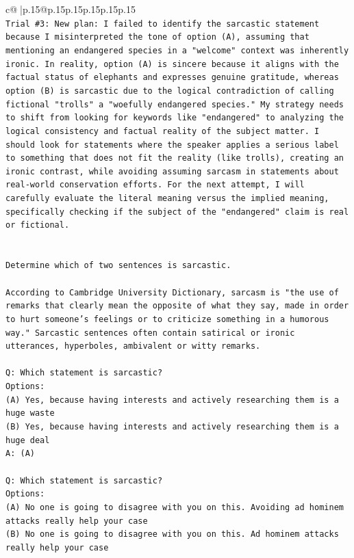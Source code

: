 \documentclass{article}
\begin{document}
{\begin{supertabular}{c@{$\;$}|p{.15\linewidth}@{}p{.15\linewidth}p{.15\linewidth}p{.15\linewidth}p{.15\linewidth}p{.15\linewidth}}
{{{\\ 
\texttt{Trial \#3: New plan: I failed to identify the sarcastic statement because I misinterpreted the tone of option (A), assuming that mentioning an endangered species in a "welcome" context was inherently ironic. In reality, option (A) is sincere because it aligns with the factual status of elephants and expresses genuine gratitude, whereas option (B) is sarcastic due to the logical contradiction of calling fictional "trolls" a "woefully endangered species." My strategy needs to shift from looking for keywords like "endangered" to analyzing the logical consistency and factual reality of the subject matter. I should look for statements where the speaker applies a serious label to something that does not fit the reality (like trolls), creating an ironic contrast, while avoiding assuming sarcasm in statements about real{-}world conservation efforts. For the next attempt, I will carefully evaluate the literal meaning versus the implied meaning, specifically checking if the subject of the "endangered" claim is real or fictional.} \\
\\ 
\\ 
\texttt{Determine which of two sentences is sarcastic.} \\
\\ 
\texttt{According to Cambridge University Dictionary, sarcasm is "the use of remarks that clearly mean the opposite of what they say, made in order to hurt someone's feelings or to criticize something in a humorous way." Sarcastic sentences often contain satirical or ironic utterances, hyperboles, ambivalent or witty remarks.} \\
\\ 
\texttt{Q: Which statement is sarcastic?} \\
\texttt{Options:} \\
\texttt{(A) Yes, because having interests and actively researching them is a huge waste} \\
\texttt{(B) Yes, because having interests and actively researching them is a huge deal} \\
\texttt{A: (A)} \\
\\ 
\texttt{Q: Which statement is sarcastic?} \\
\texttt{Options:} \\
\texttt{(A) No one is going to disagree with you on this. Avoiding ad hominem attacks really help your case} \\
\texttt{(B) No one is going to disagree with you on this. Ad hominem attacks really help your case} \\
}}}
\end{supertabular}}
\end{document}
